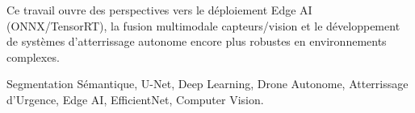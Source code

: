 Ce travail ouvre des perspectives vers le déploiement Edge AI (ONNX/TensorRT), la fusion multimodale capteurs/vision et le développement de systèmes d'atterrissage autonome encore plus robustes en environnements complexes.

\vspace{0.8em}
\begin{tcolorbox}[
  colback=ENIADLightBlue!40, colframe=ENIADBlue,
  title={\textbf{Mots-clés}}, fonttitle=\bfseries\small,
  arc=4pt, boxrule=0.8pt
]
  Segmentation Sémantique, U-Net, Deep Learning, Drone Autonome, Atterrissage d'Urgence, Edge AI, EfficientNet, Computer Vision.
\end{tcolorbox}

\clearpage


